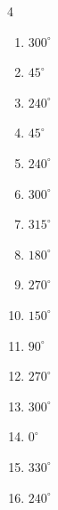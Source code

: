 \begin{multicols}{4}
\begin{enumerate}
  \item $\displaystyle 300^{\circ}$

  \item $\displaystyle 45^{\circ}$

  \item $\displaystyle 240^{\circ}$

  \item $\displaystyle 45^{\circ}$

  \item $\displaystyle 240^{\circ}$

  \item $\displaystyle 300^{\circ}$

  \item $\displaystyle 315^{\circ}$

  \item $\displaystyle 180^{\circ}$
        \phantom{$\displaystyle =\pi$}

  \item $\displaystyle 270^{\circ}$

\columnbreak %

  \item $\displaystyle 150^{\circ}$

  \item $\displaystyle 90^{\circ}$

  \item $\displaystyle 270^{\circ}$

  \item $\displaystyle 300^{\circ}$

  \item $\displaystyle 0^{\circ}$
        \phantom{$\displaystyle =0$}

  \item $\displaystyle 330^{\circ}$

  \item $\displaystyle 240^{\circ}$


\end{enumerate}
\end{multicols}

